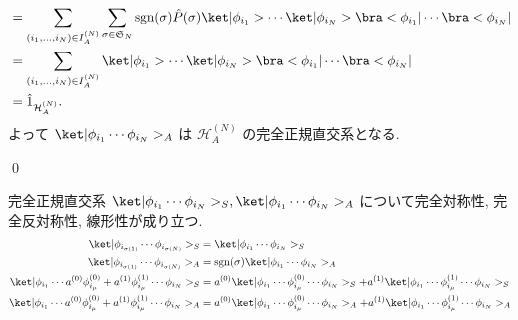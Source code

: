\documentclass[uplatex,dvipdfmx,a4paper,11pt]{jlreq}
\makeatletter
\DeclareMathOperator{\sgn}{sgn}
\newcommand{\HH}{\mathcal{H}}
\renewcommand{\SS}{\mathfrak{S}}
\numberwithin{equation}{section}
\theoremstyle{definition}
\renewenvironment{proof}[1][\proofname]{\par
  \normalfont
  \topsep6\p@\@plus6\p@ \trivlist
  \item[\hskip\labelsep{\bfseries #1}\@addpunct{\bfseries}]\ignorespaces\quad\par
}{
  \qed\endtrivlist\@endpefalse
}
\renewcommand\proofname{証明}
\makeatother
\begin{document}
\begin{proof}
\begin{align}
     & = \sum_{(i_1,\ldots,i_N)\in I_A^{(N)}}\sum_{\sigma\in\SS_N}\sgn(\sigma)\hat{P}(\sigma)\ket|\phi_{i_1}>\cdots\ket|\phi_{i_N}>\bra<\phi_{i_1}|\cdots\bra<\phi_{i_N}|                                                         \\
     & = \sum_{(i_1,\ldots,i_N)\in I_A^{(N)}}\ket|\phi_{i_1}>\cdots\ket|\phi_{i_N}>\bra<\phi_{i_1}|\cdots\bra<\phi_{i_N}|                                                                                                         \\
     & = \hat{1}_{\HH_A^{(N)}}.
  \end{align}
  よって $\ket|\phi_{i_1}\cdots\phi_{i_N}>_A$ は $\HH_A^{(N)}$ の完全正規直交系となる.
\end{proof}

\begin{proposition}
  完全正規直交系 $\ket|\phi_{i_1}\cdots\phi_{i_N}>_S, \ket|\phi_{i_1}\cdots\phi_{i_N}>_A$ について完全対称性, 完全反対称性, 線形性が成り立つ.
  \begin{align}
    \ket|\phi_{i_{\sigma(1)}}\cdots\phi_{i_{\sigma(N)}}>_S                                         & = \ket|\phi_{i_1}\cdots\phi_{i_N}>_S                                                                                                    \\
    \ket|\phi_{i_{\sigma(1)}}\cdots\phi_{i_{\sigma(N)}}>_A                                         & = \sgn(\sigma)\ket|\phi_{i_1}\cdots\phi_{i_N}>_A                                                                                        \\
    \ket|\phi_{i_1}\cdots a^{(0)}\phi_{i_\mu}^{(0)} + a^{(1)}\phi_{i_\mu}^{(1)}\cdots\phi_{i_N}>_S & = a^{(0)}\ket|\phi_{i_1}\cdots\phi_{i_\mu}^{(0)}\cdots\phi_{i_N}>_S + a^{(1)}\ket|\phi_{i_1}\cdots\phi_{i_\mu}^{(1)}\cdots\phi_{i_N}>_S \\
    \ket|\phi_{i_1}\cdots a^{(0)}\phi_{i_\mu}^{(0)} + a^{(1)}\phi_{i_\mu}^{(1)}\cdots\phi_{i_N}>_A & = a^{(0)}\ket|\phi_{i_1}\cdots\phi_{i_\mu}^{(0)}\cdots\phi_{i_N}>_A + a^{(1)}\ket|\phi_{i_1}\cdots\phi_{i_\mu}^{(1)}\cdots\phi_{i_N}>_A
  \end{align}
\end{proposition}
\end{document}
